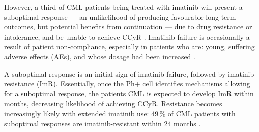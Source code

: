 However, a third of CML patients being treated with imatinib will present a suboptimal response --- an unlikelihood of producing favourable long-term outcomes, but potential benefits from continuation --- due to drug resistance or intolerance, and be unable to achieve CCyR \citep{RefWorks:doc:583b5609e4b066125b215900}. Imatinib failure is occasionally a result of patient non-compliance, especially in patients who are: young, suffering adverse effects (AEs), and whose dosage had been increased \citep{RefWorks:doc:583b6dbde4b09a21e938a834}.

A suboptimal response is an initial sign of imatinib failure, followed by imatinib resistance (ImR). Essentially, once the Ph+ cell identifies mechanisms allowing for a suboptimal response, the patient\textquotesingle s CML is expected to develop ImR within months, decreasing likelihood of achieving CCyR. Resistance becomes increasingly likely with extended imatinib use: 49\,\% of CML patients with suboptimal responses are imatinib-resistant within 24 months \citep{RefWorks:doc:583b75b4e4b027b9d415738f}.

